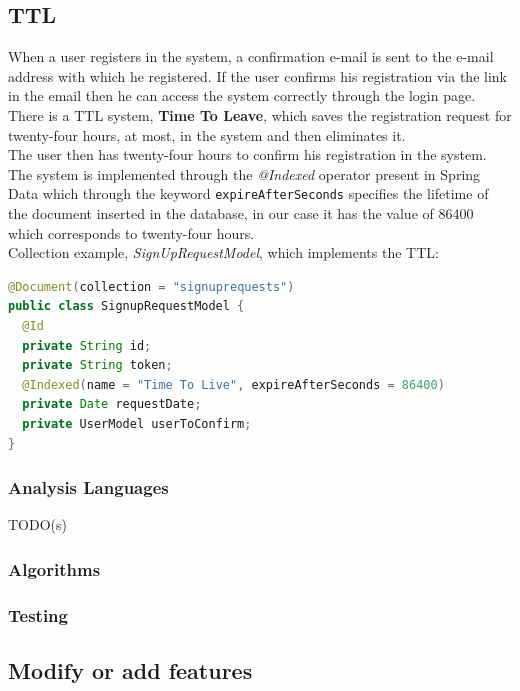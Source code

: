 \subsection{TTL}
When a user registers in the system, a confirmation e-mail is sent to the e-mail address with which he registered. If the user confirms his registration via the link in the email then he can access the system correctly through the login page.\\
There is a TTL system, \textbf{Time To Leave}, which saves the registration request for twenty-four hours, at most, in the system and then eliminates it.\\
The user then has twenty-four hours to confirm his registration in the system.\\
The system is implemented through the \textit{@Indexed} operator present in Spring Data which through the keyword \texttt{expireAfterSeconds} specifies the lifetime of the document inserted in the database, in our case it has the value of 86400 which corresponds to twenty-four hours.\\
Collection example, \textit{SignUpRequestModel}, which implements the TTL: 
\begin{lstlisting}[language=Java]
@Document(collection = "signuprequests")
public class SignupRequestModel {
  @Id
  private String id;
  private String token;
  @Indexed(name = "Time To Live", expireAfterSeconds = 86400)
  private Date requestDate;
  private UserModel userToConfirm;
}
\end{lstlisting}

\subsubsection{Analysis Languages}
\begin{huge}
TODO(s)
\end{huge}
\subsubsection{Algorithms}
\subsubsection{Testing}

\subsection{Modify or add features}
